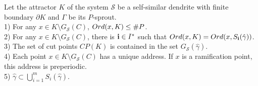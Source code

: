 \documentclass[10pt,a4paper]{amsart}
\newcommand{\eS}{{\mathcal S}}
\newcommand{\hga}{{\hat\gamma}}
\begin{document}
\begin{proposition}\label{ord_cut}
Let the attractor $K$ of the system ${\eS}$ be a self-similar dendrite with finite boundary ${\partial} K$ and $\Gamma$ be its $P$-sprout.\\
1) %
For any $x\in K\setminus G_{\eS}(C)$, ${\mathop{\rm Ord} \nolimits}(x,K)\le\#P$.\\
2)  For any $x\in K\setminus G_{\eS}(C)$, there is ${\bf {i}}\in {I^*}$ such that ${\mathop{\rm Ord} \nolimits}(x,K)={\mathop{\rm Ord} \nolimits}(x,S_{\bf {i}}(\hga))$.\\
3) The set of cut points $CP(K)$ is contained in the set $ G_{\eS}(\hat \gamma)$.\\ 
4) Each  point $x\in K\setminus G_{{\eS}}(C)$ has a unique  address. If $x$ is a ramification point, this address is preperiodic.\\
5) $\hga{\subset} \bigcup\limits_{i=1}^m S_i(\hat \gamma)$.
\end{proposition}
\end{document}
